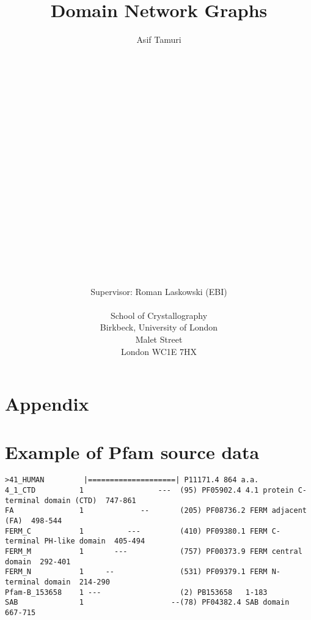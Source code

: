 \documentclass[a4paper,11pt]{scrartcl}
\title{Domain Network Graphs}
\author{Asif Tamuri
\\\\\\\\\\
\\\\\\\\\\
\\\\\\\\\\
\\\\\\\\\\
\\Supervisor: Roman Laskowski (EBI)
\\
\\School of Crystallography
\\Birkbeck, University of London
\\Malet Street
\\London WC1E 7HX}
\date {}
\begin{document}
\emergencystretch=11pt
\maketitle
\thispagestyle{empty}

\doublespacing



\tableofcontents









\clearpage

\appendix
\section*{Appendix}
\section{Example of Pfam source data}
\begin{verbatim}
>41_HUMAN         |====================| P11171.4 864 a.a.
4_1_CTD          1                 ---  (95) PF05902.4 4.1 protein C-terminal domain (CTD)  747-861
FA               1             --       (205) PF08736.2 FERM adjacent (FA)  498-544
FERM_C           1          ---         (410) PF09380.1 FERM C-terminal PH-like domain  405-494
FERM_M           1       ---            (757) PF00373.9 FERM central domain  292-401
FERM_N           1     --               (531) PF09379.1 FERM N-terminal domain  214-290
Pfam-B_153658    1 ---                  (2) PB153658   1-183
SAB              1                    --(78) PF04382.4 SAB domain  667-715
\end{verbatim}                    
\end{document}
